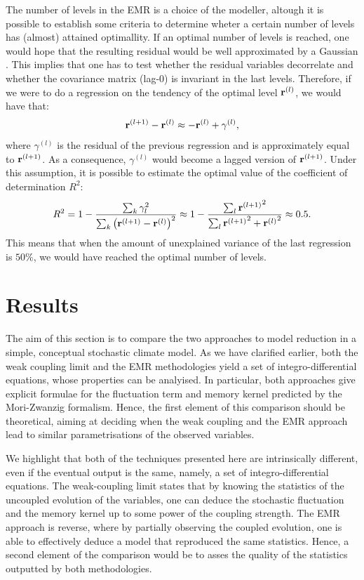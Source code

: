 \documentclass[12pt]{article}
\begin{document}
The number of levels in the EMR is a choice of the modeller, altough it is possible to establish some criteria to determine wheter a certain number of levels has (almost) attained optimallity. If an optimal number of levels is reached, one would hope that the resulting residual would be well approximated by a Gaussian \cite{kondrashovdata2015, Kravtsov2005}. This implies that one has to test whether the residual variables decorrelate and whether the covariance matrix (lag-0) is invariant in the last levels. Therefore, if we were to do a regression on the tendency of the optimal level $\mathbf{r}^{(l)}$, we would have that:
\begin{equation}
	\mathbf{r}^{(l+1)}-\mathbf{r}^{(l)}\approx-\mathbf{r}^{(l)} + \gamma ^{(l)},
\end{equation}
where $\gamma^{(l)}$ is the residual of the previous regression and is approximately equal to $\mathbf{r}^{(l+1)}$. As a consequence, $\gamma^{(l)}$ would become a lagged version of $\mathbf{r}^{(l+1)}$. Under this assumption, it is possible to estimate the optimal value of the coefficient of determination $R^2$:
\begin{equation}\label{emrdiagnostic}
	R^2=1-\frac{\sum _{k}\gamma_l^2}{\sum_{k}\left(\mathbf{r}^{(l+1)} - \mathbf{r}^{(l)} \right)^2}\approx 1 - \frac{\sum _l{\mathbf{r}^{(l+1)}}^2}{\sum _l {\mathbf{r}^{(l+1)}}^2 + {\mathbf{r}^{(l)}}^2} \approx 0.5.
\end{equation}
This means that when the amount of unexplained variance of the last regression is $50\%$, we would have reached the optimal number of levels. 


\section{Results}

The aim of this section is to compare the two approaches to model reduction in a simple, conceptual stochastic climate model. As we have clarified earlier, both the weak coupling limit and the EMR methodologies yield a set of integro-differential equations, whose properties can be analyised. In particular, both approaches give explicit formulae for the fluctuation term and memory kernel predicted by the Mori-Zwanzig formalism. Hence, the first element of this comparison should be theoretical, aiming at deciding when the weak coupling and the EMR approach lead to similar parametrisations of the observed variables.

We highlight that both of the techniques presented here are intrinsically different, even if the eventual output is the same, namely, a set of integro-differential equations. The weak-coupling limit states that by knowing the statistics of the uncoupled evolution of the variables, one can deduce the stochastic fluctuation and the memory kernel up to some power of the coupling strength. The EMR approach is reverse, where by partially observing the coupled evolution, one is able to effectively deduce a model that reproduced the same statistics. Hence, a second element of the comparison would be to asses the quality of the statistics outputted by both methodologies.
\end{document}
